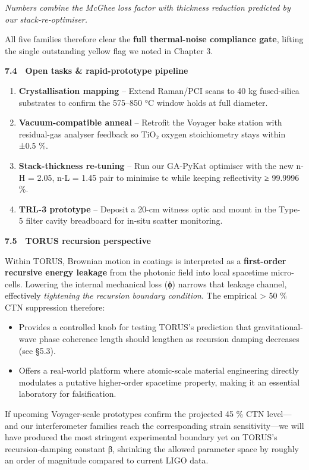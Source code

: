 \documentclass[]{article}
\begin{document}
\emph{Numbers combine the McGhee loss factor with thickness reduction
predicted by our stack-re-optimiser.}

All five families therefore clear the \textbf{full thermal-noise
compliance gate}, lifting the single outstanding yellow flag we noted in
Chapter 3.

\textbf{7.4 Open tasks \& rapid-prototype pipeline}

\begin{enumerate}
\def\labelenumi{\arabic{enumi}.}
\item
  \textbf{Crystallisation mapping} -- Extend Raman/PCI scans to 40 kg
  fused-silica substrates to confirm the 575--850 °C window holds at
  full diameter.
\item
  \textbf{Vacuum-compatible anneal} -- Retrofit the Voyager bake station
  with residual-gas analyser feedback so TiO₂ oxygen stoichiometry stays
  within ±0.5 \%.
\item
  \textbf{Stack-thickness re-tuning} -- Run our GA-PyKat optimiser with
  the new n-H = 2.05, n-L = 1.45 pair to minimise tc while keeping
  reflectivity ≥ 99.9996 \%.
\item
  \textbf{TRL-3 prototype} -- Deposit a 20-cm witness optic and mount in
  the Type-5 filter cavity breadboard for in-situ scatter monitoring.
\end{enumerate}

\textbf{7.5 TORUS recursion perspective}

Within TORUS, Brownian motion in coatings is interpreted as a
\textbf{first-order recursive energy leakage} from the photonic field
into local spacetime micro-cells. Lowering the internal mechanical loss
(ϕ) narrows that leakage channel, effectively \emph{tightening the
recursion boundary condition}. The empirical \textgreater{} 50 \% CTN
suppression therefore:

\begin{itemize}
\item
  Provides a controlled knob for testing TORUS's prediction that
  gravitational-wave phase coherence length should lengthen as recursion
  damping decreases (see §5.3).
\item
  Offers a real-world platform where atomic-scale material engineering
  directly modulates a putative higher-order spacetime property, making
  it an essential laboratory for falsification.
\end{itemize}

If upcoming Voyager-scale prototypes confirm the projected 45 \% CTN
level---and our interferometer families reach the corresponding strain
sensitivity---we will have produced the most stringent experimental
boundary yet on TORUS's recursion-damping constant β, shrinking the
allowed parameter space by roughly an order of magnitude compared to
current LIGO data.
\end{document}
